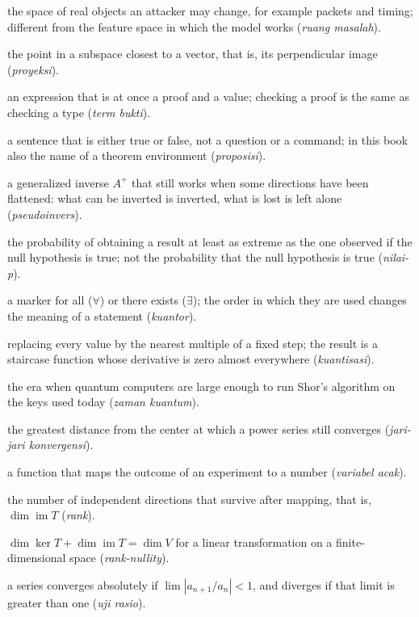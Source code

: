 \begin{description}[style=nextline,itemsep=0.35em]
  \item[Problem space] the space of real objects an attacker may change, for example packets and timing; different from the feature space in which the model works (\emph{ruang masalah}).
  \item[Projection] the point in a subspace closest to a vector, that is, its perpendicular image (\emph{proyeksi}).
  \item[Proof term] an expression that is at once a proof and a value; checking a proof is the same as checking a type (\emph{term bukti}).
  \item[Proposition] a sentence that is either true or false, not a question or a command; in this book also the name of a theorem environment (\emph{proposisi}).
  \item[Pseudoinverse] a generalized inverse $A^{+}$ that still works when some directions have been flattened: what can be inverted is inverted, what is lost is left alone (\emph{pseudoinvers}).
  \item[P-value] the probability of obtaining a result at least as extreme as the one observed if the null hypothesis is true; not the probability that the null hypothesis is true (\emph{nilai-p}).
  \item[Quantifier] a marker for all ($\forall$) or there exists ($\exists$); the order in which they are used changes the meaning of a statement (\emph{kuantor}).
  \item[Quantization] replacing every value by the nearest multiple of a fixed step; the result is a staircase function whose derivative is zero almost everywhere (\emph{kuantisasi}).
  \item[Quantum computing era] the era when quantum computers are large enough to run Shor's algorithm on the keys used today (\emph{zaman kuantum}).
  \item[Radius of convergence] the greatest distance from the center at which a power series still converges (\emph{jari-jari konvergensi}).
  \item[Random variable] a function that maps the outcome of an experiment to a number (\emph{variabel acak}).
  \item[Rank] the number of independent directions that survive after mapping, that is, $\dim\operatorname{im}T$ (\emph{rank}).
  \item[Rank-nullity theorem] $\dim\ker T+\dim\operatorname{im}T=\dim V$ for a linear transformation on a finite-dimensional space (\emph{rank-nullity}).
  \item[Ratio test] a series converges absolutely if $\lim|a_{n+1}/a_n|<1$, and diverges if that limit is greater than one (\emph{uji rasio}).

\end{description}
